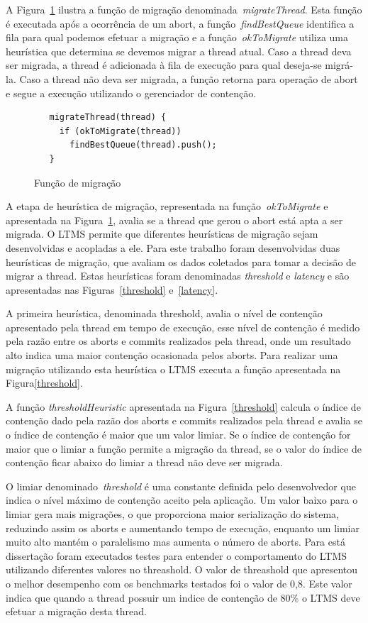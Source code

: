 \documentclass[diss,capa]{texufpel}
\begin{document}
A Figura~\ref{migration} ilustra a função de migração denominada~\emph{migrateThread}. Esta função é executada após a ocorrência de um abort, a função~\emph{findBestQueue} identifica a fila para qual podemos efetuar a migração e a função~\emph{okToMigrate} utiliza uma heurística que determina se devemos migrar a thread atual. Caso a thread deva ser migrada, a thread é adicionada à fila de execução para qual deseja-se migrá-la. Caso a thread não deva ser migrada, a função retorna para operação de abort e segue a execução utilizando o gerenciador de contenção.

\begin{figure}[htbp]
 \centering
 \begin{lstlisting}
   migrateThread(thread) {
     if (okToMigrate(thread))
       findBestQueue(thread).push();
   }
 \end{lstlisting}
 \caption{Função de migração}
 \label{migration}
\end{figure}

A etapa de heurística de migração, representada na função~\emph{okToMigrate} e apresentada na Figura~\ref{migration}, avalia se a thread que gerou o abort está apta a ser migrada. O LTMS permite que diferentes heurísticas de migração sejam desenvolvidas e acopladas a ele.  Para este trabalho foram desenvolvidas duas heurísticas de migração, que avaliam os dados coletados para tomar a decisão de migrar a thread. Estas heurísticas foram denominadas \emph{threshold} e \emph{latency} e são apresentadas nas Figuras~\ref{threshold} e~\ref{latency}.

A primeira heurística, denominada threshold, avalia o nível de contenção apresentado pela thread em tempo de execução, esse nível de contenção é medido pela razão entre os aborts e commits realizados pela thread, onde um resultado alto indica uma maior contenção ocasionada pelos aborts. Para realizar uma migração utilizando esta heurística o LTMS executa a função apresentada na Figura\ref{threshold}.

A função \emph{thresholdHeuristic} apresentada na Figura~\ref{threshold} calcula o índice de contenção dado pela razão dos aborts e commits realizados pela thread e avalia se o índice de contenção é maior que um valor limiar. Se o índice de contenção for maior que o limiar a função permite a migração da thread, se o valor do índice de contenção ficar abaixo do limiar a thread não deve ser migrada.

O limiar denominado~\emph{threshold} é uma constante definida pelo desenvolvedor que indica o nível máximo de contenção aceito pela aplicação. Um valor baixo para o limiar gera mais migrações, o que proporciona maior serialização do sistema, reduzindo assim os aborts e aumentando tempo de execução, enquanto um limiar muito alto mantém o paralelismo mas aumenta o número de aborts. Para está dissertação foram executados testes para entender o comportamento do LTMS utilizando diferentes valores no threashold. O valor de threashold que apresentou o melhor desempenho com os benchmarks testados foi o valor de 0,8. Este valor indica que quando a thread possuir um indice de contenção de 80\% o LTMS deve efetuar a migração desta thread.
\end{document}
